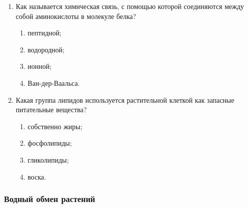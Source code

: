 \begin{enumerate}
\item Как называется химическая связь, с помощью которой соединяются между собой аминокислоты в молекуле белка?
\begin{enumerate}
	\item пептидной; 
	\item водородной; 
	\item ионной; 
	\item Ван-дер-Ваальса. 
\end{enumerate}

\item Какая группа липидов используется растительной клеткой как запасные питательные вещества?
\begin{enumerate}
	\item собственно жиры; 
	\item фосфолипиды; 
	\item гликолипиды; 
	\item воска. 
\end{enumerate}

\end{enumerate}

\subsubsection*{Водный обмен растений}

